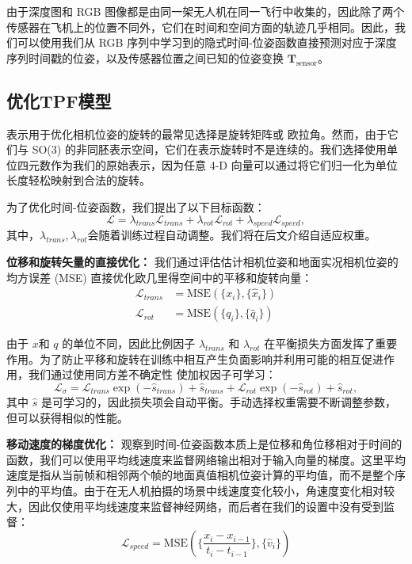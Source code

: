 由于深度图和 RGB 图像都是由同一架无人机在同一飞行中收集的，因此除了两个传感器在飞机上的位置不同外，它们在时间和空间方面的轨迹几乎相同。因此，我们可以使用我们从 RGB 序列中学习到的隐式时间-位姿函数直接预测对应于深度序列时间戳的位姿，以及传感器位置之间已知的位姿变换 $\mathbf{T}_\text{sensor}$。


\subsection{优化TPF模型}
表示用于优化相机位姿的旋转的最常见选择是旋转矩阵\cite{yen-chen_inerf_2021}或 欧拉角。然而，由于它们与 SO(3) 的非同胚表示空间，它们在表示旋转时不是连续的\cite{kendall_posenet_2015}。我们选择使用单位四元数作为我们的原始表示，因为任意 4-D 向量可以通过将它们归一化为单位长度轻松映射到合法的旋转。

为了优化时间-位姿函数，我们提出了以下目标函数：
\begin{equation}
    \mathcal{L} = \lambda_{trans}\mathcal{L}_{trans}+\lambda_{rot}\mathcal{L}_{rot}+\lambda_{speed}\mathcal{L}_{speed},
\end{equation}
其中，$\lambda_{trans}, \lambda_{rot}$会随着训练过程自动调整。我们将在后文介绍自适应权重。

\textbf{位移和旋转矢量的直接优化：}
我们通过评估估计相机位姿和地面实况相机位姿的均方误差 (MSE) 直接优化欧几里得空间中的平移和旋转向量：
\begin{align}
    \mathcal{L}_{trans} &= \text{MSE}(\{x_i\}, \{\hat{x}_i\})\\
    \mathcal{L}_{rot} &= \text{MSE}(\{q_i\}, \{\hat{q}_i\})
\end{align}

由于 $x$和 $q$ 的单位不同，因此比例因子 $\lambda_{trans}$ 和 $\lambda_{rot}$ 在平衡损失方面发挥了重要作用。为了防止平移和旋转在训练中相互产生负面影响并利用可能的相互促进作用，我们通过使用同方差不确定性 \cite{kendall_geometric_2017} 使加权因子可学习：\begin{equation}
    \mathcal{L}_{\sigma} = \mathcal{L}_{trans} \exp(−\hat{s}_{trans}) + \hat{s}_{trans} + \mathcal{L}_{rot} \exp( −\hat{s}_{rot}) + \hat{s}_{rot},
\end{equation}
其中 $\hat{s}$ 是可学习的，因此损失项会自动平衡。手动选择权重需要不断调整参数，但可以获得相似的性能。

\textbf{移动速度的梯度优化：}
观察到时间-位姿函数本质上是位移和角位移相对于时间的函数，我们可以使用平均线速度来监督网络输出相对于输入向量的梯度。这里平均速度是指从当前帧和相邻两个帧的地面真值相机位姿计算的平均值，而不是整个序列中的平均值。由于在无人机拍摄的场景中线速度变化较小，角速度变化相对较大，因此仅使用平均线速度来监督神经网络，而后者在我们的设置中没有受到监督：
\begin{equation}
    \mathcal{L}_{speed} = \text{MSE}(\{\frac{x_i-x_{i-1}}{t_i-t_{i-1}}\}, \{\hat{v}_i\})
\end{equation}

